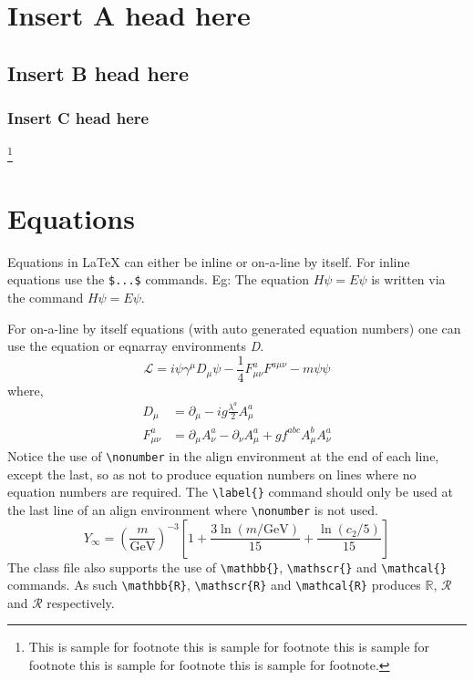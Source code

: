 \documentclass[journal=eds]{CAM-MODERN}%
\theoremstyle{definition}
\numberwithin{equation}{section}
\begin{document}
\lipsum[4]

\section{Insert A head here}
\subsection{Insert B head here}
\subsubsection{Insert C head here}
\lipsum[4]\footnote{This is sample for footnote this is sample for footnote this is sample for footnote  this is sample for footnote this is sample for footnote.}

\section{Equations}

Equations in \LaTeX{} can either be inline or on-a-line by itself. For
inline equations use the \verb+$...$+ commands. Eg: The equation
$H\psi = E \psi$ is written via the command $H \psi = E \psi$.

For on-a-line by itself equations (with auto generated equation numbers)
one can use the equation or eqnarray environments \textit{D}.
\begin{equation}
\mathcal{L} = i {\psi} \gamma^\mu D_\mu \psi
    - \frac{1}{4} F_{\mu\nu}^a F^{a\mu\nu} - m {\psi} \psi
\label{eq1}
\end{equation}
where,
\begin{align}
D_\mu &=  \partial_\mu - ig \frac{\lambda^a}{2} A^a_\mu
\nonumber \\
F^a_{\mu\nu} &= \partial_\mu A^a_\nu - \partial_\nu A^a_\mu
    + g f^{abc} A^b_\mu A^a_\nu
\label{eq2}
\end{align}
Notice the use of \verb+\nonumber+ in the align environment at the end
of each line, except the last, so as not to produce equation numbers on
lines where no equation numbers are required. The \verb+\label{}+ command
should only be used at the last line of an align environment where
\verb+\nonumber+ is not used.
\begin{equation}
Y_\infty = \left( \frac{m}{\textrm{GeV}} \right)^{-3}
    \left[ 1 + \frac{3 \ln(m/\textrm{GeV})}{15}
    + \frac{\ln(c_2/5)}{15} \right]
\end{equation}
The class file also supports the use of \verb+\mathbb{}+, \verb+\mathscr{}+ and
\verb+\mathcal{}+ commands. As such \verb+\mathbb{R}+, \verb+\mathscr{R}+
and \verb+\mathcal{R}+ produces $\mathbb{R}$, $\mathscr{R}$ and $\mathcal{R}$
respectively.
\end{document}
